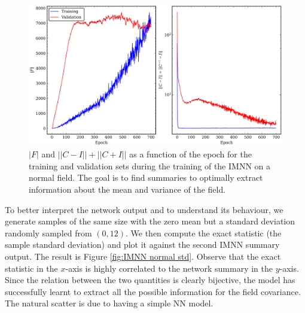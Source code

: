 \begin{figure}
    \centering
    \includegraphics[width=0.95\linewidth]{img/ML/normal_plot_training.png}
    \caption{$|F|$ and $||C-I ||+||C+I||$ as a function of the epoch for the training and validation sets during the training of the IMNN on a normal field. The goal is to find summaries to optimally extract information about the mean and variance of the field.}
    \label{fig:IMNN training normal test}
\end{figure}

To better interpret the network output and to understand its behaviour, we generate samples of the same size with the zero mean but a standard deviation randomly sampled from $(0,12)$. We then compute the exact statistic (the sample standard deviation) and plot it against the second IMNN summary output. The result is Figure \ref{fig:IMNN normal std}. Observe that the exact statistic in the $x$-axis is highly correlated to the network summary in the $y$-axis. Since the relation between the two quantities is clearly bijective, the model has successfully learnt to extract all the possible information for the field covariance. The natural scatter is due to having a simple NN model.

